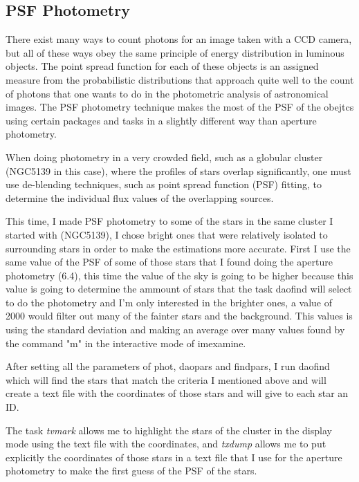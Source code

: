 \subsection{PSF Photometry}

There exist many ways to count photons for an image taken with a CCD camera, but all of these ways obey the same principle of energy distribution in luminous objects. The point spread function for each of these objects is an assigned measure from the probabilistic distributions that approach quite well to the count of photons that one wants to do in the photometric analysis of astronomical images. The PSF photometry technique makes the most of the PSF of the obejtcs using certain packages and tasks in a slightly different way than aperture photometry.

When doing photometry in a very crowded field, such as a globular cluster (NGC5139 in this case), where the profiles of stars overlap significantly, one must use de-blending techniques, such as point spread function (PSF) fitting, to determine the individual flux values of the overlapping sources. 

This time, I made PSF photometry to some of the stars in the same cluster I started with (NGC5139), I chose bright ones that were relatively isolated to surrounding stars in order to make the estimations more accurate. First I use the same value of the PSF of some of those stars that I found doing the aperture photometry (6.4), this time the value of the sky is going to be higher because this value is going to determine the ammount of stars that the task daofind will select to do the photometry and I'm only interested in the brighter ones, a value of 2000 would filter out many of the fainter stars and the background. This values is using the standard deviation and making an average over many values found by the command "m" in the interactive mode of imexamine. 

After setting all the parameters of phot, daopars and findpars, I run daofind which will find the stars that match the criteria I mentioned above and will create a text file with the coordinates of those stars and will give to each star an ID.

The task \textit{tvmark} allows me to highlight the stars of the cluster in the display mode using the text file with the coordinates, and \textit{txdump} allows me to  put explicitly the coordinates of those stars in a text file that I use for the aperture photometry to make the first guess of the PSF of the stars.


